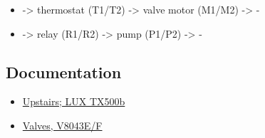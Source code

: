 \documentclass[11pt]{article}
\begin{document}
\begin{itemize}
\item -> thermostat (T1/T2) -> valve motor (M1/M2) -> -
\item -> relay (R1/R2) -> pump (P1/P2) -> -
\end{itemize}

\subsection{Documentation}
\label{sec-1-1}


\begin{itemize}
\item \href{http://www.luxproducts.com/support/TX500b_Eng_WebManual.pdf}{Upstairs; LUX TX500b}
\item \href{https://customer.honeywell.com/resources/techlit/TechLitDocuments/60-0000s/60-2133.pdf}{Valves, V8043E/F}
\end{itemize}
\end{document}
